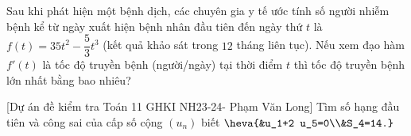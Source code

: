 \begin{bt}%
	Sau khi phát hiện một bệnh dịch, các chuyên gia y tế ước tính số người nhiễm bệnh kể từ ngày xuất hiện bệnh nhân đầu tiên đến ngày thứ $t$ là $f(t)=35 t^2-\dfrac{5}{3} t^3$ (kết quả khảo sát trong $12$ tháng liên tục). Nếu xem đạo hàm $f'(t)$ là tốc độ truyền bệnh (người/ngày) tại thời điểm $t$ thì tốc độ truyền bệnh lớn nhất bằng bao nhiêu?
\end{bt}

\begin{bt}%
[Dự án đề kiểm tra Toán 11 GHKI NH23-24- Phạm Văn Long]%
	Tìm số hạng đầu tiên và công sai của cấp số cộng $(u_n)$ biết $\heva{&u_1+2 u_5=0\\&S_4=14.}$
\end{bt}

